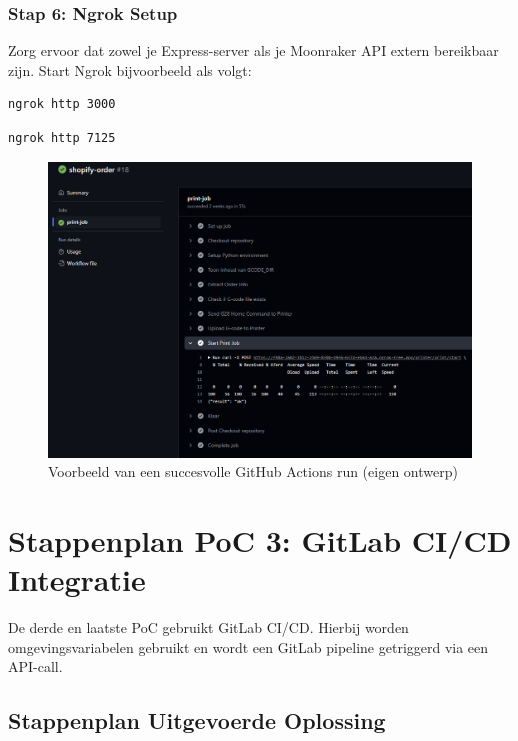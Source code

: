 \begin{enumerate}
\subsubsection{Stap 6: Ngrok Setup}

Zorg ervoor dat zowel je Express-server als je Moonraker API extern bereikbaar zijn. Start Ngrok bijvoorbeeld als volgt:

\begin{lstlisting}[language=bash, caption=Ngrok tunnel starten voor Express]
ngrok http 3000
\end{lstlisting}

\begin{lstlisting}[language=bash, caption=Ngrok tunnel starten voor Moonraker]
ngrok http 7125
\end{lstlisting}

\begin{figure}[H]
    \centering
    \includegraphics[width=1\linewidth]{foto's/Github/GithubPrintSucces.png}
    \caption{Voorbeeld van een succesvolle GitHub Actions run (eigen ontwerp)}
    \label{fig:Github_Succes}
\end{figure}

\section{Stappenplan PoC 3: GitLab CI/CD Integratie}

De derde en laatste PoC gebruikt GitLab CI/CD. Hierbij worden omgevingsvariabelen gebruikt en wordt een GitLab pipeline getriggerd via een API-call.

\subsection{Stappenplan Uitgevoerde Oplossing}


\end{enumerate}
